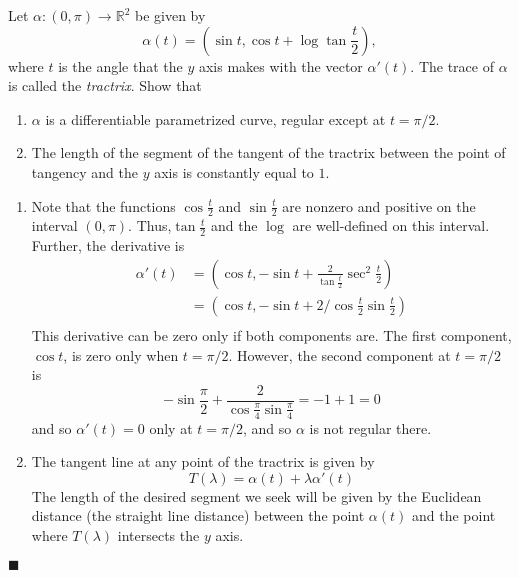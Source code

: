 \documentclass[12pt]{article}
\renewcommand{\qed}{\hfill$\blacksquare$}
\renewenvironment{proof}{\begin{addmargin}[1em]{0em}\begin{newproof}}{\end{newproof}\end{addmargin}\qed}
\newenvironment{problem}[2][Exercise]{\begin{trivlist}
\item[\hskip \labelsep {\bfseries #1}\hskip \labelsep {\bfseries #2.}]}{\end{trivlist}}
\begin{document}
\begin{problem}{1.3.4}
Let $\alpha:\left(0,\pi\right)\rightarrow \mathbb{R}^2$ be given by \[ \alpha\left(t\right) = \left( \sin t, \cos t + \log \tan \frac{t}{2} \right), \] where $t$ is the angle that the $y$ axis makes with the vector $\alpha'\left(t\right)$. The trace of $\alpha$ is called the \textit{tractrix}. Show that 
\begin{enumerate}[label=(\alph*)]
	\item $\alpha$ is a differentiable parametrized curve, regular except at $t=\pi/2$.
	\item The length of the segment of the tangent of the tractrix between the point of tangency and the $y$ axis is constantly equal to $1$.
\end{enumerate}
\end{problem}
\begin{proof}
\begin{enumerate}[label=(\alph*)]
	\item Note that the functions $\cos \frac{t}{2}$ and $\sin \frac{t}{2}$ are nonzero and positive on the interval $\left(0,\pi\right)$. Thus,$\tan \frac{t}{2}$ and the $\log$ are well-defined on this interval. Further, the derivative is\begin{align}
	\alpha'\left(t\right) & = \left(\cos t, -\sin t + \frac{2}{\tan \frac{t}{2} } \sec^2 \frac{t}{2} \right) \\
	& = \left( \cos t, -\sin t + 2/ \cos \frac{t}{2} \sin \frac{t}{2} \right) \\
\end{align}
This derivative can be zero only if both components are. The first component, $\cos t$, is zero only when $t = \pi /2$. However, the second component at $t=\pi/2$ is \[ -\sin \frac{\pi}{2} + \frac{2}{\cos\frac{\pi}{4}\sin \frac{\pi}{4} }  = -1 + 1 = 0  \] and so $\alpha'\left(t\right)=0$ only at $t=\pi/2$, and so $\alpha$ is not regular there.

	\item The tangent line at any point of the tractrix is given by \[ T\left(\lambda\right) = \alpha\left(t\right) + \lambda \alpha'\left(t\right) \] The length of the desired segment we seek will be given by the Euclidean distance (the straight line distance) between the point $\alpha\left(t\right)$ and the point where $T\left(\lambda\right)$ intersects the $y$ axis.
\end{enumerate}
\end{proof}
\end{document}
